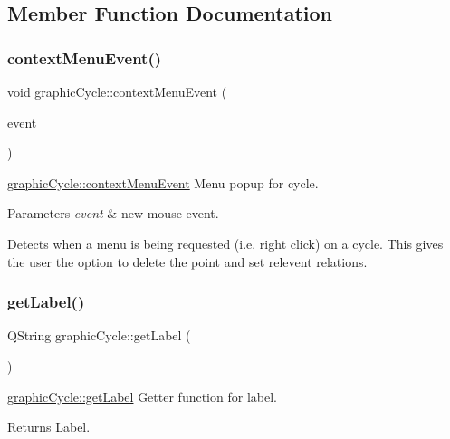 \subsection{Member Function Documentation}
\mbox{\label{classgraphic_cycle_a1a58dbc3675f315985fabe57d5f42940}} 
\subsubsection{\texorpdfstring{context\+Menu\+Event()}{contextMenuEvent()}}
{\footnotesize\ttfamily void graphic\+Cycle\+::context\+Menu\+Event (\begin{DoxyParamCaption}\item[{Q\+Graphics\+Scene\+Context\+Menu\+Event $\ast$}]{event }\end{DoxyParamCaption})}



\mbox{\hyperlink{classgraphic_cycle_a1a58dbc3675f315985fabe57d5f42940}{graphic\+Cycle\+::context\+Menu\+Event}} Menu popup for cycle. 


\begin{DoxyParams}{Parameters}
{\em event} & new mouse event.\\
\hline
\end{DoxyParams}
Detects when a menu is being requested (i.\+e. right click) on a cycle. This gives the user the option to delete the point and set relevent relations. \mbox{\label{classgraphic_cycle_a52f423bc245a9a89a7353d1a6736dfb7}} 
\subsubsection{\texorpdfstring{get\+Label()}{getLabel()}}
{\footnotesize\ttfamily Q\+String graphic\+Cycle\+::get\+Label (\begin{DoxyParamCaption}{ }\end{DoxyParamCaption})}



\mbox{\hyperlink{classgraphic_cycle_a52f423bc245a9a89a7353d1a6736dfb7}{graphic\+Cycle\+::get\+Label}} Getter function for label. 

\begin{DoxyReturn}{Returns}
Label. 
\end{DoxyReturn}
\mbox{\label{classgraphic_cycle_ac589011ca82a6c2ab648ed4b9fb1632f}} 
